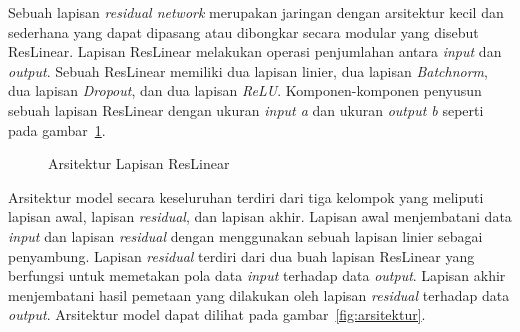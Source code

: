 Sebuah lapisan \textit{residual network} merupakan jaringan dengan arsitektur kecil dan sederhana yang
dapat dipasang atau dibongkar secara modular yang disebut ResLinear. Lapisan ResLinear melakukan operasi
penjumlahan antara \textit{input} dan \textit{output}. Sebuah ResLinear memiliki dua
lapisan linier, dua lapisan \textit{Batchnorm}, dua lapisan \textit{Dropout}, dan dua lapisan \textit{ReLU}.
Komponen-komponen penyusun sebuah lapisan ResLinear dengan ukuran \textit{input a} dan ukuran \textit{output b} seperti
pada gambar~\ref{fig:reslinear}.

\begin{figure}[htbp]
    \begin{center}
    \end{center}
    \vspace{-20pt}
    \captionsetup{labelfont=bf, textfont=bf}
    \caption{Arsitektur Lapisan ResLinear}
    \vspace{-10pt}
    \captionsetup{labelfont=md, textfont=md}
    \label{fig:reslinear}
\end{figure}

Arsitektur model secara keseluruhan terdiri dari tiga kelompok yang meliputi lapisan awal, lapisan
\textit{residual}, dan lapisan akhir. Lapisan awal menjembatani data \textit{input} dan lapisan \textit{residual}
dengan menggunakan sebuah lapisan linier sebagai penyambung. Lapisan \textit{residual} terdiri dari
dua buah lapisan ResLinear yang berfungsi untuk memetakan pola data \textit{input} terhadap data \textit{output}.
Lapisan akhir menjembatani hasil pemetaan yang dilakukan oleh lapisan \textit{residual} terhadap data \textit{output}.
Arsitektur model dapat dilihat pada gambar~\ref{fig:arsitektur}.

